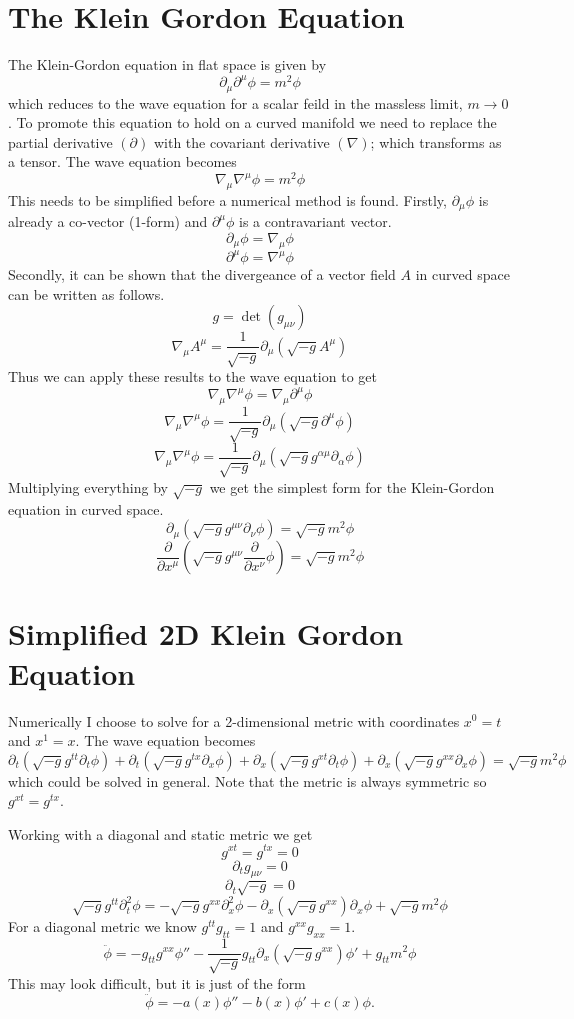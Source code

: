 \documentclass[11pt, oneside]{report}  %
\numberwithin{equation}{section}
\begin{document}
\section{The Klein Gordon Equation}
The Klein-Gordon equation in flat space is given by
$$\partial_\mu \partial^\mu \phi = m^2 \phi $$
which reduces to the wave equation for a scalar feild in the massless limit, $m \rightarrow 0$. To promote this equation to hold on a curved manifold we need to replace the partial derivative $(\partial)$ with the covariant derivative $(\nabla)$; which transforms as a tensor. The wave equation becomes 
$$ \nabla_\mu \nabla^\mu \phi = m^2 \phi$$
This needs to be simplified before a numerical method is found. Firstly, $\partial_\mu \phi$ is already a co-vector (1-form) and $\partial^\mu \phi$ is a contravariant vector. 
$$ \partial_\mu \phi = \nabla_\mu \phi$$
$$ \partial^\mu \phi = \nabla^\mu \phi$$
Secondly, it can be shown that the divergeance of a vector field $A$ in curved space can be written as follows.
$$ g = \det(g_{\mu\nu})$$
$$ \nabla_\mu A^\mu=\frac{1}{\sqrt{-g}}\partial_{\mu}\left( \sqrt{-g}A^\mu\right)$$ 
Thus we can apply these results to the wave equation to get 
$$  \nabla_\mu \nabla^\mu \phi =  \nabla_\mu \partial^\mu \phi$$
$$  \nabla_\mu \nabla^\mu \phi = \frac{1}{\sqrt{-g}}\partial_{\mu}\left( \sqrt{-g}\partial^\mu\phi\right)$$
$$  \nabla_\mu \nabla^\mu \phi = \frac{1}{\sqrt{-g}}\partial_{\mu}\left( \sqrt{-g}g^{\alpha\mu}\partial_\alpha\phi\right)$$
Multiplying everything by $\sqrt{-g}$ we get the simplest form for the Klein-Gordon equation in curved space.
$$ \boxed{\partial_\mu\left(\sqrt{-g}g^{\mu\nu}\partial_\nu \phi \right) = \sqrt{-g}m^2\phi}$$
$$ \boxed{\frac{\partial}{\partial x^\mu}\left(\sqrt{-g}g^{\mu\nu}\frac{\partial}{\partial x^\nu} \phi \right) = \sqrt{-g}m^2\phi}$$

\section{Simplified 2D Klein Gordon Equation}
Numerically I choose to solve for a 2-dimensional metric with coordinates $x^0 = t$ and $x^1 = x$. The wave equation becomes
$$ \partial_t\left(\sqrt{-g}g^{tt}\partial_t \phi \right) +\partial_t\left(\sqrt{-g}g^{tx}\partial_x \phi \right)+\partial_x\left(\sqrt{-g}g^{xt}\partial_t \phi \right)+\partial_x\left(\sqrt{-g}g^{xx}\partial_x \phi \right) = \sqrt{-g}m^2\phi$$
which could be solved in general. Note that the metric is always symmetric so $g^{xt} = g^{tx}$.

Working with a diagonal and static metric we get 
$$ g^{xt} = g^{tx}  =0$$
$$ \partial_t g_{\mu\nu} = 0$$
$$ \partial_t \sqrt{-g} =0$$
$$\sqrt{-g}g^{tt}\partial^2_t\phi = -\sqrt{-g}g^{xx}\partial^2_x\phi -\partial_x(\sqrt{-g}g^{xx})\partial_x\phi+ \sqrt{-g}m^2\phi$$
For a diagonal metric we know $g^{tt}g_{tt} = 1$ and $g^{xx}g_{xx} = 1$.
$$\boxed{\ddot \phi = -g_{tt}g^{xx}\phi''- \frac{1}{\sqrt{-g}}g_{tt}\partial_x(\sqrt{-g}g^{xx})\phi' + g_{tt} m^2 \phi}$$
This may look difficult, but it is just of the form
$$ \ddot \phi = -a(x)\phi'' -b(x)\phi' + c(x) \phi.$$
\end{document}
